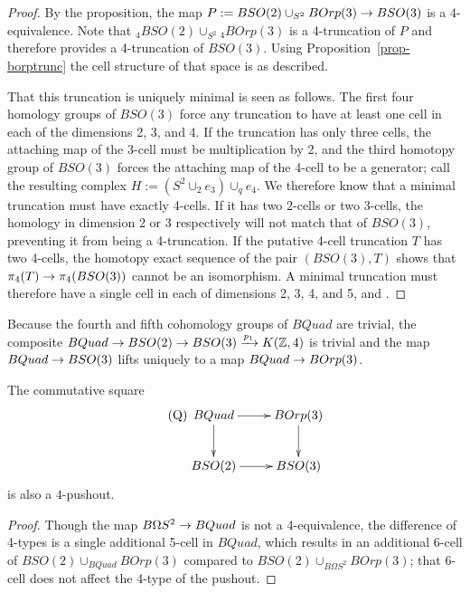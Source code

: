 \documentclass{amsart}
\begin{document}
\begin{proof}
By the proposition, the map $P := BSO(2) \cup_{S^2} BOrp(3) \rightarrow BSO(3)$ is a 4-equivalence.  Note that $_4 BSO(2) \cup_{S^2} {}_4 BOrp(3)$ is a 4-truncation of $P$ and therefore provides a 4-truncation of $BSO(3)$.  Using Proposition~\ref{prop-borptrunc} the cell structure of that space is as described.  

That this truncation is uniquely minimal is seen as follows.  The first four homology groups of $BSO(3)$ force any truncation to have at least one cell in each of the dimensions 2, 3, and 4.  If the truncation has only three cells, the attaching map of the 3-cell must be multiplication by 2, and the third homotopy group of $BSO(3)$ forces the attaching map of the 4-cell to be a generator; call the resulting complex $H := (S^2 \cup_2 e_3) \cup_q e_4$.    We therefore know that a minimal truncation must have exactly 4-cells.  If it has two 2-cells or two 3-cells, the homology in dimension 2 or 3 respectively will not match that of $BSO(3)$, preventing it from being a 4-truncation.  If the putative 4-cell truncation $T$ has two 4-cells, the homotopy exact sequence of the pair $(BSO(3), T)$ shows that $\pi_4(T) \rightarrow \pi_4(BSO(3))$ cannot be an isomorphism.  A minimal truncation must therefore have a single cell in each of dimensions 2, 3, 4, and 5, and .
\end{proof}

Because the fourth and fifth cohomology groups of $BQuad$ are trivial, the composite $BQuad \rightarrow BSO(2) \rightarrow BSO(3) \xrightarrow{p_1} K(\mathbb Z,4)$ is trivial and the map $BQuad \rightarrow BSO(3)$ lifts uniquely to a map $BQuad \rightarrow BOrp(3)$.

\begin{corollary}
The commutative square
\begin{equation} \label{quad-pushout} \tag{Q}
\xymatrix{
BQuad \ar[r] \ar[d] & BOrp(3) \ar[d] \\
BSO(2) \ar[r] & BSO(3)
}
\end{equation}
is also a $4$-pushout.
\end{corollary}
\begin{proof}
Though the map $B\Omega S^2 \rightarrow BQuad$ is not a 4-equivalence, the difference of 4-types is a single additional 5-cell in $BQuad$, which results in an additional 6-cell of $BSO(2) \cup_{BQuad} BOrp(3)$ compared to $BSO(2) \cup_{B\Omega S^2} BOrp(3)$; that 6-cell does not affect the 4-type of the pushout.
\end{proof}
\end{document}
